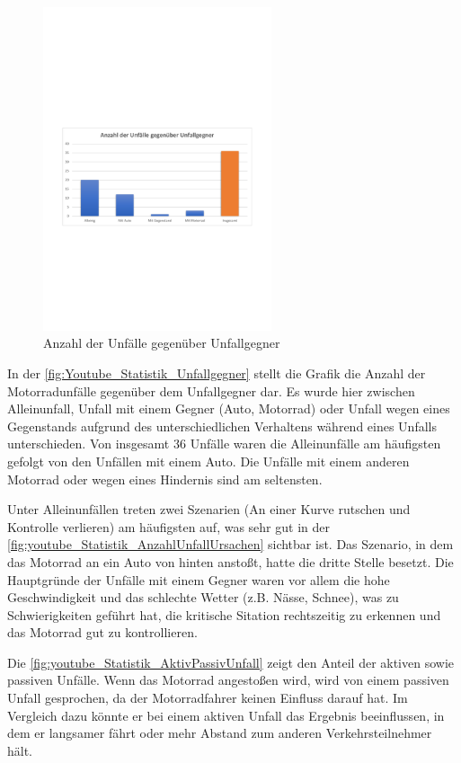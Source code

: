 \begin{figure}
	\centering
	\includegraphics[width=0.6\textwidth]{Bilder/youtube_Statistik_Unfallgegner.pdf}
	\caption{Anzahl der Unfälle gegenüber Unfallgegner}
	\label{fig:Youtube_Statistik_Unfallgegner}
\end{figure}


In der \autoref{fig:Youtube_Statistik_Unfallgegner} stellt die Grafik die Anzahl der Motorradunfälle gegenüber dem Unfallgegner dar. Es wurde hier zwischen Alleinunfall, Unfall mit einem Gegner (Auto, Motorrad) oder Unfall wegen eines Gegenstands aufgrund des unterschiedlichen Verhaltens während eines Unfalls unterschieden. Von insgesamt 36 Unfälle waren die Alleinunfälle am häufigsten gefolgt von den Unfällen mit einem Auto. Die Unfälle mit einem anderen Motorrad oder wegen eines Hindernis sind am seltensten.
 
Unter Alleinunfällen treten zwei Szenarien (An einer Kurve rutschen und Kontrolle verlieren) am häufigsten auf, was sehr gut in der \autoref{fig:youtube_Statistik_AnzahlUnfallUrsachen} sichtbar ist. Das Szenario, in dem das Motorrad an ein Auto von hinten anstoßt, hatte die dritte Stelle besetzt. Die Hauptgründe der Unfälle mit einem Gegner waren vor allem die hohe Geschwindigkeit und das schlechte Wetter (z.B. Nässe, Schnee), was zu Schwierigkeiten geführt hat, die kritische Sitation rechtszeitig zu erkennen und das Motorrad gut zu kontrollieren.

Die \autoref{fig:youtube_Statistik_AktivPassivUnfall} zeigt den Anteil der aktiven sowie passiven Unfälle. Wenn das Motorrad angestoßen wird, wird von einem passiven Unfall gesprochen, da der Motorradfahrer keinen Einfluss darauf hat. Im Vergleich dazu könnte er bei einem aktiven Unfall das Ergebnis beeinflussen, in dem er langsamer fährt oder mehr Abstand zum anderen Verkehrsteilnehmer hält.

